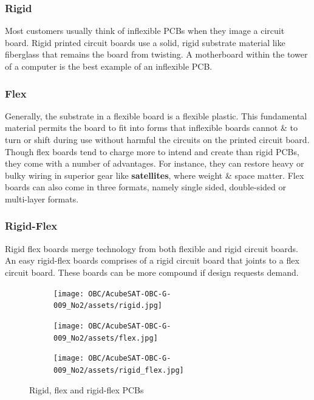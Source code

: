 \documentclass[final]{cubedoc}
\begin{document}
	\subsubsection{Rigid}
	Most customers usually think of inflexible PCBs when they image a circuit board. Rigid printed circuit boards use a solid, rigid substrate material like fiberglass that remains the board from twisting. A motherboard within the tower of a computer is the best example of an inflexible PCB.
	
	\subsubsection{Flex}
	Generally, the substrate in a flexible board is a flexible plastic. This fundamental material permits the board to fit into forms that inflexible boards cannot & to turn or shift during use without harmful the circuits on the printed circuit board. Though flex boards tend to charge more to intend and create than rigid PCBs, they come with a number of advantages. For instance, they can restore heavy or bulky wiring in superior gear like \textbf{satellites}, where weight & space matter. Flex boards can also come in three formats, namely single sided, double-sided or multi-layer formats.
	
	\subsubsection{Rigid-Flex}
	Rigid flex boards merge technology from both flexible and rigid circuit boards. An easy rigid-flex boards comprises of a rigid circuit board that joints to a flex circuit board. These boards can be more compound if design requests demand.
	
	\begin{figure}[h!]
		\centering
		\begin{subfigure}{.3\textwidth}
			\centering
			\texttt{[image: OBC/AcubeSAT-OBC-G-009\_No2/assets/rigid.jpg]}
			\label{fig:sub1}
		\end{subfigure}%
		\begin{subfigure}{.3\textwidth}
			\centering
			\texttt{[image: OBC/AcubeSAT-OBC-G-009\_No2/assets/flex.jpg]}
			\label{fig:sub2}
		\end{subfigure}
		\begin{subfigure}{.3\textwidth}
			\centering
			\texttt{[image: OBC/AcubeSAT-OBC-G-009\_No2/assets/rigid\_flex.jpg]}
			\label{fig:sub2}
		\end{subfigure}
		\caption{Rigid, flex and rigid-flex PCBs}
		\label{fig:test}
	\end{figure}
	
\end{document}
